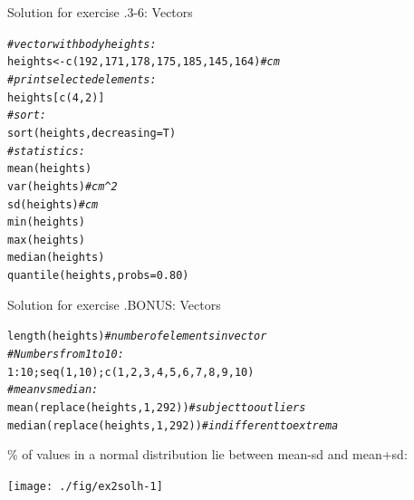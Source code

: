 \documentclass[xcolor=table,           xcolor=dvipsnames]{beamer}\usepackage[]{graphicx}\usepackage[]{color}
\makeatletter
\newcommand{\hlnum}[1]{\textcolor[rgb]{0,0,0}{#1}}
\newcommand{\hlcom}[1]{\textcolor[rgb]{0,0.392,0}{\textit{#1}}}
\newcommand{\hlopt}[1]{\textcolor[rgb]{0,0,0}{#1}}
\newcommand{\hlstd}[1]{\textcolor[rgb]{0,0,0}{#1}}
\newcommand{\hlkwb}[1]{\textcolor[rgb]{0,0,0}{#1}}
\newcommand{\hlkwc}[1]{\textcolor[rgb]{1,0,1}{#1}}
\newcommand{\hlkwd}[1]{\textcolor[rgb]{0,0,1}{#1}}
\newenvironment{kframe}{%
 \def\at@end@of@kframe{}%
 \ifinner\ifhmode%
  \def\at@end@of@kframe{\end{minipage}}%
  \begin{minipage}{\columnwidth}%
 \fi\fi%
 \def\FrameCommand##1{\hskip\@totalleftmargin \hskip-\fboxsep
 \colorbox{shadecolor}{##1}\hskip-\fboxsep
     \hskip-\linewidth \hskip-\@totalleftmargin \hskip\columnwidth}%
 \MakeFramed {\advance\hsize-\width
   \@totalleftmargin\z@ \linewidth\hsize
   \@setminipage}}%
 {\par\unskip\endMakeFramed%
 \at@end@of@kframe}
\newenvironment{knitrout}{}{} %
\newcounter{exercisecount}
\makeatother
\begin{document}

\begin{frame}[fragile]{Solution for exercise .3-6: Vectors}
\begin{knitrout}
\color{fgcolor}\begin{kframe}
\begin{alltt}
\hlcom{# vector with body heights:}
\hlstd{heights} \hlkwb{<-} \hlkwd{c}\hlstd{(}\hlnum{192}\hlstd{,} \hlnum{171}\hlstd{,} \hlnum{178}\hlstd{,} \hlnum{175}\hlstd{,} \hlnum{185}\hlstd{,} \hlnum{145}\hlstd{,} \hlnum{164}\hlstd{)} \hlcom{# cm}
\hlcom{# print selected elements:}
\hlstd{heights[} \hlkwd{c}\hlstd{(}\hlnum{4}\hlstd{,}\hlnum{2}\hlstd{) ]}
\hlcom{# sort:}
\hlkwd{sort}\hlstd{(heights,} \hlkwc{decreasing}\hlstd{=T)}
\hlcom{# statistics:}
\hlkwd{mean}\hlstd{(heights)}
\hlkwd{var}\hlstd{(heights)} \hlcom{# cm^2}
\hlkwd{sd}\hlstd{(heights)} \hlcom{# cm}
\hlkwd{min}\hlstd{(heights)}
\hlkwd{max}\hlstd{(heights)}
\hlkwd{median}\hlstd{(heights)}
\hlkwd{quantile}\hlstd{(heights,} \hlkwc{probs}\hlstd{=}\hlnum{0.80}\hlstd{)}
\end{alltt}
\end{kframe}
\end{knitrout}
\end{frame}


\begin{frame}[fragile]{Solution for exercise .BONUS: Vectors}
\begin{knitrout}
\color{fgcolor}\begin{kframe}
\begin{alltt}
\hlkwd{length}\hlstd{(heights)} \hlcom{# number of elements in vector}
\hlcom{# Numbers from 1 to 10:}
\hlnum{1}\hlopt{:}\hlnum{10}  \hlstd{;}  \hlkwd{seq}\hlstd{(}\hlnum{1}\hlstd{,}\hlnum{10}\hlstd{)  ;}  \hlkwd{c}\hlstd{(}\hlnum{1}\hlstd{,}\hlnum{2}\hlstd{,}\hlnum{3}\hlstd{,}\hlnum{4}\hlstd{,}\hlnum{5}\hlstd{,}\hlnum{6}\hlstd{,}\hlnum{7}\hlstd{,}\hlnum{8}\hlstd{,}\hlnum{9}\hlstd{,}\hlnum{10}\hlstd{)}
\hlcom{# mean vs median:}
\hlkwd{mean}\hlstd{(}   \hlkwd{replace}\hlstd{(heights,} \hlnum{1}\hlstd{,} \hlnum{292}\hlstd{) )} \hlcom{# subject to outliers}
\hlkwd{median}\hlstd{(} \hlkwd{replace}\hlstd{(heights,} \hlnum{1}\hlstd{,} \hlnum{292}\hlstd{) )} \hlcom{# indifferent to extrema}
\end{alltt}
\end{kframe}
\end{knitrout}
\% of values in a normal distribution lie between mean-sd and mean+sd:
\begin{knitrout}
\color{fgcolor}

{\centering \texttt{[image: ./fig/ex2solh-1]} 

}



\end{knitrout}
\end{frame}
\end{document}
